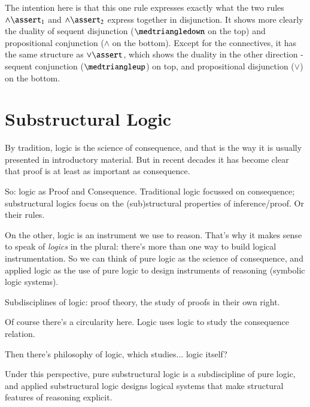 \documentclass{article}
\begin{document}

The intention here is that this one rule expresses exactly what the
two rules \(\land\linfer_1\) and \(\land\linfer_2\) express together in
disjunction. It shows more clearly the duality of sequent disjunction
(\(\medtriangledown\) on the top) and propositional conjunction
(\(\land\) on the bottom). Except for the connectives, it has the same
structure as \(\lor\linfer\), which shows the duality in the other
direction - sequent conjunction (\(\medtriangleup\)) on top, and
propositional disjunction (\(\lor\)) on the bottom.

\section{Substructural Logic}

By tradition, logic is the science of consequence, and that is the way
it is usually presented in introductory material. But in recent
decades it has become clear that proof is at least as important as
consequence.

So: logic as Proof and Consequence. Traditional logic focussed on
consequence; substructural logics focus on the (sub)structural
properties of inference/proof. Or their rules.

On the other, logic is an instrument we use to reason. That's why it
makes sense to speak of \textit{logics} in the plural: there's more
than one way to build logical instrumentation. So we can think of pure
logic as the science of consequence, and applied logic as the use of
pure logic to design instruments of reasoning (symbolic logic
systems).

Subdisciplines of logic: proof theory, the study of proofs in their
own right.

Of course there's a circularity here. Logic uses logic to study the
consequence relation.

Then there's philosophy of logic, which studies... logic itself?

Under this perspective, pure substructural logic is a subdiscipline of
pure logic, and applied substructural logic designs logical systems
that make structural features of reasoning explicit.
\end{document}
